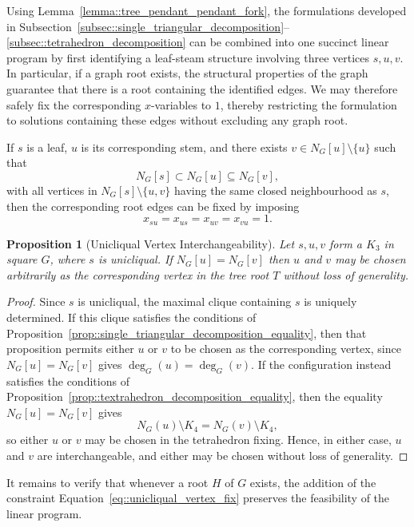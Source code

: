 \documentclass[11pt]{article}
\newtheorem{proposition}{Proposition}
\begin{document}
Using Lemma~\eqref{lemma::tree_pendant_pendant_fork}, the formulations developed in Subsection~\ref{subsec::single_triangular_decomposition}--\ref{subsec::tetrahedron_decomposition} can be combined into one succinct linear program by first identifying a leaf-steam structure involving three vertices $s, u, v$. In particular, if a graph root exists, the structural properties of the graph guarantee that there is a root containing the identified edges. We may therefore safely fix the corresponding $x$-variables to $1$, thereby restricting the formulation to solutions containing these edges without excluding any graph root.

If $s$ is a leaf, $u$ is its corresponding stem, and there exists $v\in N_G[u]\setminus\{u\}$ such that
\[
N_G[s]\subset N_G[u]\subseteq N_G[v],
\]
with all vertices in $N_G[s]\setminus\{u,v\}$ having the same closed neighbourhood as $s$, then the corresponding root edges can be fixed by imposing
\begin{equation} \label{eq::unicliqual_vertex_fix}
  x_{su}=x_{us}=x_{uv}=x_{vu}=1.
\end{equation}

\begin{proposition}[Unicliqual Vertex Interchangeability] \label{prop::unicliqual_decomposition_equality}
  Let $s,u,v$ form a $K_3$ in square $G$, where $s$ is unicliqual. If $N_G[u]=N_G[v]$ then $u$ and $v$ may be chosen arbitrarily as the corresponding vertex in the tree root $T$ without loss of generality.
\end{proposition}
\begin{proof} 
  Since $s$ is unicliqual, the maximal clique containing $s$ is uniquely determined. If this clique satisfies the conditions of Proposition~\ref{prop::single_triangular_decomposition_equality}, then that proposition permits either $u$ or $v$ to be chosen as the corresponding vertex, since $N_G[u]=N_G[v]$ gives $\deg_G(u)=\deg_G(v)$. If the configuration instead satisfies the conditions of Proposition~\ref{prop::textrahedron_decomposition_equality}, then the equality $N_G[u]=N_G[v]$ gives
  \[
  N_G(u)\setminus K_4=N_G(v)\setminus K_4,
  \]
  so either $u$ or $v$ may be chosen in the tetrahedron fixing. Hence, in either case, $u$ and $v$ are interchangeable, and either may be chosen without loss of generality.
\end{proof}

It remains to verify that whenever a root $H$ of $G$ exists, the addition of the constraint Equation~\eqref{eq::unicliqual_vertex_fix} preserves the feasibility of the linear program.
\end{document}
